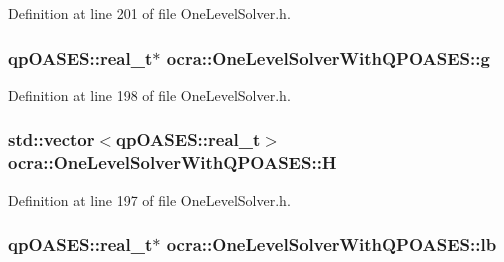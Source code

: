 Definition at line 201 of file One\+Level\+Solver.\+h.

\subsubsection[{\texorpdfstring{g}{g}}]{\setlength{\rightskip}{0pt plus 5cm}qp\+O\+A\+S\+E\+S\+::real\+\_\+t$\ast$ ocra\+::\+One\+Level\+Solver\+With\+Q\+P\+O\+A\+S\+E\+S\+::g\hspace{0.3cm}{\ttfamily [protected]}}\hypertarget{classocra_1_1OneLevelSolverWithQPOASES_a56fea8397d0c6b40fee373d8863f0b26}{}\label{classocra_1_1OneLevelSolverWithQPOASES_a56fea8397d0c6b40fee373d8863f0b26}


Definition at line 198 of file One\+Level\+Solver.\+h.

\subsubsection[{\texorpdfstring{H}{H}}]{\setlength{\rightskip}{0pt plus 5cm}std\+::vector$<$qp\+O\+A\+S\+E\+S\+::real\+\_\+t$>$ ocra\+::\+One\+Level\+Solver\+With\+Q\+P\+O\+A\+S\+E\+S\+::H\hspace{0.3cm}{\ttfamily [protected]}}\hypertarget{classocra_1_1OneLevelSolverWithQPOASES_aba3bdf7d777d9e3e8015570652cf396a}{}\label{classocra_1_1OneLevelSolverWithQPOASES_aba3bdf7d777d9e3e8015570652cf396a}


Definition at line 197 of file One\+Level\+Solver.\+h.

\subsubsection[{\texorpdfstring{lb}{lb}}]{\setlength{\rightskip}{0pt plus 5cm}qp\+O\+A\+S\+E\+S\+::real\+\_\+t$\ast$ ocra\+::\+One\+Level\+Solver\+With\+Q\+P\+O\+A\+S\+E\+S\+::lb\hspace{0.3cm}{\ttfamily [protected]}}\hypertarget{classocra_1_1OneLevelSolverWithQPOASES_a82eaebae8f92464066e9b5348b1737f9}{}\label{classocra_1_1OneLevelSolverWithQPOASES_a82eaebae8f92464066e9b5348b1737f9}


